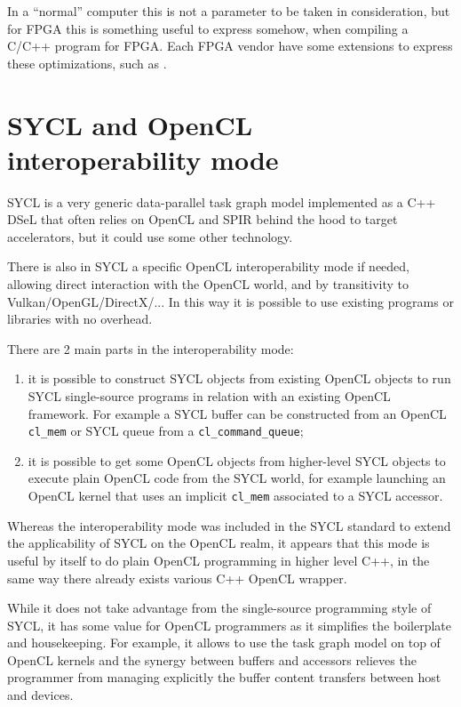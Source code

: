 \documentclass[sigplan, review, authordraft]{acmart}
\begin{document}
In a ``normal'' computer this is not a parameter to be taken in
consideration, but for FPGA this is something useful to express somehow,
when compiling a C/C++ program for FPGA. Each FPGA vendor have some
extensions to express these optimizations, such as
\cite{iwocl16,sdsoc,hls,sdaccel,altera}.


\section{SYCL and OpenCL interoperability mode}
\label{sec:sycl-opencl-inter}

SYCL is a very generic data-parallel task graph model implemented as a
C++ DSeL that often relies on OpenCL and SPIR behind the hood to
target accelerators, but it could use some other technology.

There is also in SYCL a specific OpenCL interoperability mode if
needed, allowing direct interaction with the OpenCL world, and by
transitivity to Vulkan/OpenGL/DirectX/... In this way it is possible
to use existing programs or libraries with no overhead.

There are 2 main parts in the interoperability mode:
\begin{enumerate}
\item it is possible to construct SYCL objects from existing OpenCL
  objects to run SYCL single-source programs in relation with an
  existing OpenCL framework. For example a SYCL buffer can be
  constructed from an OpenCL \lstinline|cl_mem| or SYCL queue from a
  \lstinline|cl_command_queue|;
\item it is possible to get some OpenCL objects from higher-level SYCL
  objects to execute plain OpenCL code from the SYCL world, for
  example launching an OpenCL kernel that uses an implicit
  \lstinline|cl_mem| associated to a SYCL accessor.
\end{enumerate}

Whereas the interoperability mode was included in the SYCL standard to
extend the applicability of SYCL on the OpenCL realm, it appears that
this mode is useful by itself to do plain OpenCL programming in higher
level C++, in the same way there already exists various C++ OpenCL
wrapper.

While it does not take advantage from the single-source programming
style of SYCL, it has some value for OpenCL programmers as it
simplifies the boilerplate and housekeeping. For example, it allows to
use the task graph model on top of OpenCL kernels and the synergy
between buffers and accessors relieves the programmer from managing
explicitly the buffer content transfers between host and devices.
\end{document}
